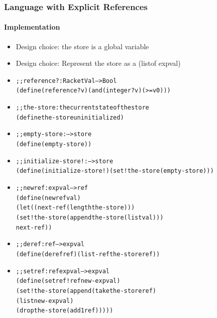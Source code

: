 \documentclass{beamer}
\newcommand{\elist}{\texttt{\textquotesingle{()}}}
\newcommand{\quot}{\texttt{\textquotesingle{}}}
\begin{document}
\begin{frame}[fragile]
\frametitle{Language with Explicit References}
\framesubtitle{Implementation}
\begin{scriptsize}
\begin{itemize}
\item<1-> Design choice: the store is a global variable

\item<1-> Design choice: Represent the store as a (listof expval)

\item<2->
\begin{alltt}
;; reference? : RacketVal --> Bool
(define (reference? v) (and (integer? v) (>= v 0)))
\end{alltt}

\item<3->
\begin{alltt}
;; the-store: the current state of the  store
(define the-store \quot{}uninitialized)
\end{alltt}

\item<4->
\begin{alltt}
;; empty-store :  --> store
(define (empty-store) \elist{})
\end{alltt}

\item<5->
\begin{alltt}
;; initialize-store! :  --> store
(define (initialize-store!) (set! the-store (empty-store)))
\end{alltt}

\item<6->
\begin{alltt}
;; newref : expval --> ref
(define (newref val)
  (let ((next-ref (length the-store)))
    (set! the-store (append the-store (list val)))
    next-ref))
\end{alltt}

\item<7->
\begin{alltt}
;; deref : ref --> expval
(define (deref ref) (list-ref the-store ref))
\end{alltt}

\item<8->
\begin{alltt}
;; setref : ref expval --> expval
(define (setref! ref new-expval)
  (set! the-store (append (take the-store ref)
                          (list new-expval)
                          (drop the-store (add1 ref)))))
\end{alltt}

\end{itemize}
\end{scriptsize}
\end{frame}
\end{document}
